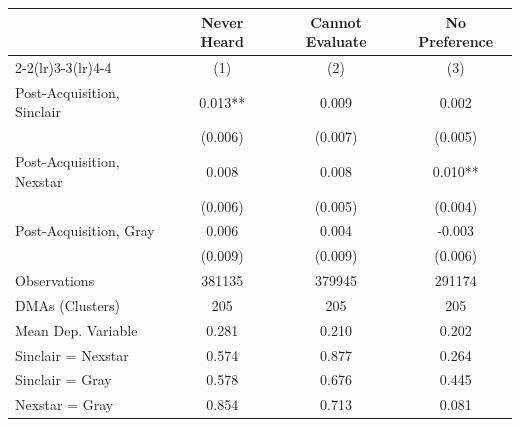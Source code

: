 {
\def\sym#1{\ifmmode^{#1}\else\(^{#1}\)\fi}
\begin{tabular}{l*{3}{c}}
\toprule
                &\multicolumn{1}{c}{Never Heard}&\multicolumn{1}{c}{Cannot Evaluate}&\multicolumn{1}{c}{No Preference}\\\cmidrule(lr){2-2}\cmidrule(lr){3-3}\cmidrule(lr){4-4}
                &\multicolumn{1}{c}{(1)}   &\multicolumn{1}{c}{(2)}   &\multicolumn{1}{c}{(3)}   \\
\midrule
Post-Acquisition, Sinclair&    0.013** &    0.009   &    0.002   \\
                &  (0.006)   &  (0.007)   &  (0.005)   \\
Post-Acquisition, Nexstar&    0.008   &    0.008   &    0.010** \\
                &  (0.006)   &  (0.005)   &  (0.004)   \\
Post-Acquisition, Gray&    0.006   &    0.004   &   -0.003   \\
                &  (0.009)   &  (0.009)   &  (0.006)   \\
\midrule
Observations    &   381135   &   379945   &   291174   \\
DMAs (Clusters) &      205   &      205   &      205   \\
Mean Dep. Variable&    0.281   &    0.210   &    0.202   \\
\midrule Sinclair = Nexstar&    0.574   &    0.877   &    0.264   \\
Sinclair = Gray &    0.578   &    0.676   &    0.445   \\
Nexstar = Gray  &    0.854   &    0.713   &    0.081   \\
\bottomrule
\end{tabular}
}
